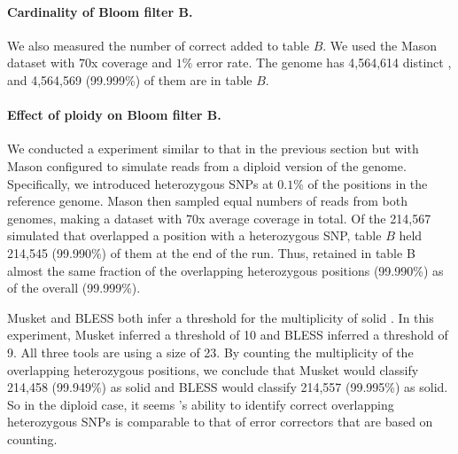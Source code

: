 \documentclass{bmcart}
\begin{document}


\paragraph{Cardinality of Bloom filter B.}  We also measured the number of correct \kmers added to table $B$. We used the Mason dataset with $70$x coverage and $1\%$ error rate. The \ecoli genome has 4,564,614 distinct \kmers, and 4,564,569 (99.999\%) of them are in table $B$.  

\paragraph{Effect of ploidy on Bloom filter B.}  We conducted a experiment similar to that in the previous section but with Mason configured to simulate reads from a diploid version of the \ecoli genome.
Specifically, we introduced heterozygous SNPs at $0.1\%$ of the positions in the reference genome.
Mason then sampled equal numbers of reads from both genomes, making a dataset with $70$x average coverage in total.
Of the 214,567 simulated \kmers that overlapped a position with a heterozygous SNP, table $B$ held 214,545 (99.990\%) of them at the end of the run. 
Thus, \tool retained in table B almost the same fraction of the \kmers overlapping heterozygous positions (99.990\%) as of the \kmers overall (99.999\%).

Musket and BLESS both infer a threshold for the multiplicity of solid \kmers. In this experiment, Musket inferred a threshold of 10 and BLESS inferred a threshold of 9.
All three tools are using a \kmer size of 23.
By counting the multiplicity of the \kmers overlapping heterozygous positions, we conclude that Musket would classify 214,458 (99.949\%) as solid and BLESS would classify 214,557 (99.995\%) as solid.
So in the diploid case, it seems \tool's ability to identify correct \kmers overlapping heterozygous SNPs is comparable to that of error correctors that are based on counting.
\end{document}

